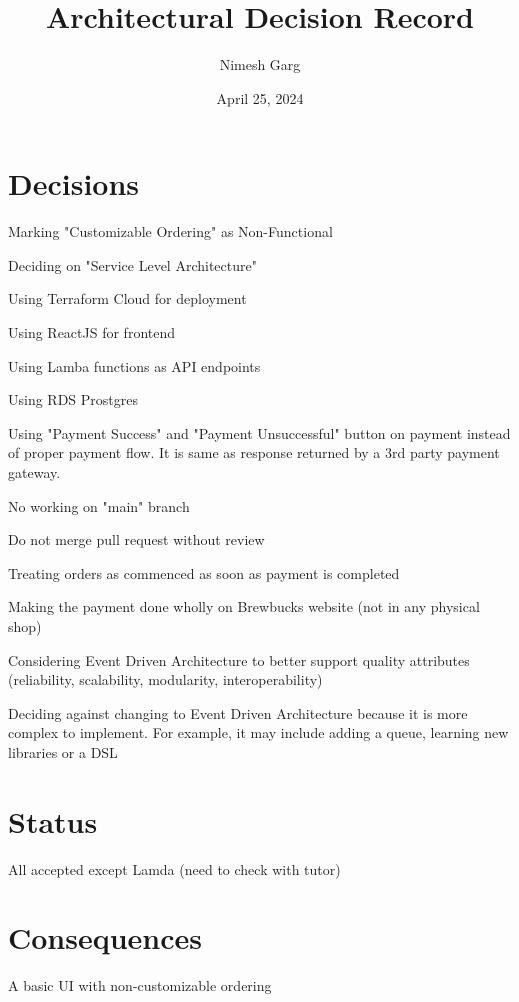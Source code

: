 \documentclass{article}
\title{Architectural Decision Record}
\author{Nimesh Garg}
\date{April 25, 2024}
\begin{document}
\maketitle

\section{Decisions}
\begin{description}
\item Marking "Customizable Ordering" as Non-Functional   
\item Deciding on "Service Level Architecture" 
\item Using Terraform Cloud for deployment
\item Using ReactJS for frontend
\item Using Lamba functions as API endpoints
\item Using RDS Prostgres
\item Using "Payment Success" and "Payment Unsuccessful" button on payment instead of proper payment flow. It is same as response returned by a 3rd party payment gateway.
\item No working on "main" branch
\item Do not merge pull request without review
\item Treating orders as commenced as soon as payment is completed
\item Making the payment done wholly on Brewbucks website (not in any physical shop)
\item Considering Event Driven Architecture to better support quality attributes (reliability, scalability, modularity, interoperability)
\item Deciding against changing to Event Driven Architecture because it is more complex to implement. For example, it may include adding a queue, learning new libraries or a DSL
\end{description}

\section{Status}
\begin{description}
    \item All accepted except Lamda (need to check with tutor)
\end{description}

\section{Consequences}
\begin{description}
    \item A basic UI with non-customizable ordering
\end{description}
\end{document}
